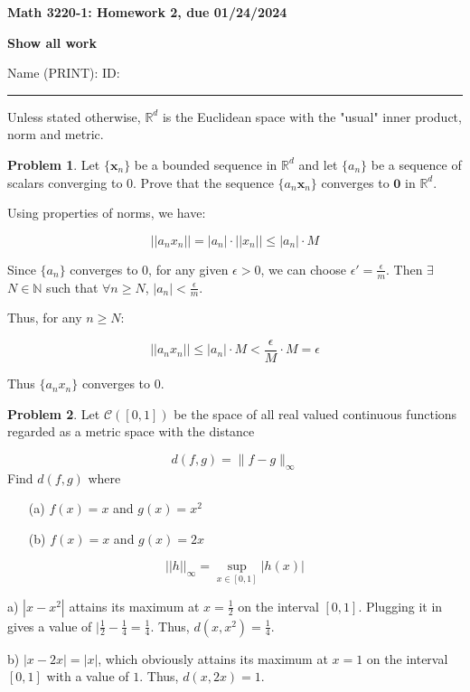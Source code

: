 \documentclass[12]{amsart}
\theoremstyle{definition}
\newtheorem{xca}{Problem}
\newcommand{\R}{\mathbb{R}}
\newcommand{\N}{\mathbb{N}}
\newcommand{\norm}[1]{\lVert#1\rVert}
\newcommand{\lskip}{\newpage}
\begin{document}
\centerline{ \bf Math 3220-1: Homework 2, due 01/24/2024 }
\bigskip
\centerline{ \bf Show all work}
\bigskip
\noindent Name (PRINT):\hskip 2.5in ID:
\smallskip

\hrule

\bigskip
Unless stated otherwise, $\R^d$ is the Euclidean space with the "usual" inner product, norm and metric.

\bigskip

\begin{xca}
Let $\{\bm{x}_n\}$ be a bounded sequence in $\R^d$ and let $\{a_n\}$ be a  sequence of scalars converging to $0$.
Prove that the sequence $\{a_n\bm{x}_n\}$ converges to $\bm{0}$ in $\R^d$.

\end{xca}

Using properties of norms, we have:

\[||a_n x_n|| = |a_n| \cdot ||x_n|| \leq |a_n| \cdot M\]

Since $\{a_n\}$ converges to 0, for any given $\epsilon > 0$, we can choose
$\epsilon' = \frac{\epsilon}{m}$. Then $\exists$ $N \in \N$ such that
$\forall n \geq N$, $|a_n| < \frac{\epsilon}{m}$.

Thus, for any $n \geq N$:

\[||a_n x_n|| \leq |a_n| \cdot M < \frac{\epsilon}{M} \cdot M = \epsilon\]

Thus $\{a_n x_n\}$ converges to 0.

\lskip
\begin{xca}
Let $\mathcal{C}([0,1])$ be the space of all real valued continuous functions regarded as a metric space with the distance

$$d(f, g)=\norm{f-g}_\infty$$
Find $d(f,g)$ where

\begin{itemize}

\item [(a)] $f(x)=x$ and $g(x)=x^2$
\item [(b)] $f(x)=x$ and $g(x)=2x$
\end{itemize}

\end{xca}

\[||h||_{\infty} = \sup_{x \in [0, 1]} |h(x)|\]

a) $|x - x^2|$ attains its maximum at $x = \frac{1}{2}$ on the interval $[0, 1]$.
Plugging it in gives a value of $|\frac{1}{2} - \frac{1}{4} = \frac{1}{4}$.
Thus, $d(x, x^2) = \frac{1}{4}$.

b) $|x - 2x| = |x|$, which obviously attains its maximum at $x = 1$ on the interval
$[0, 1]$ with a value of $1$.
Thus, $d(x, 2x) = 1$.
\end{document}
